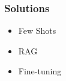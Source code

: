 \begin{frame}[fragile]\frametitle{Solutions}
  \begin{itemize}
    \item Few Shots
	\item RAG
	\item Fine-tuning
  \end{itemize}
\end{frame}











